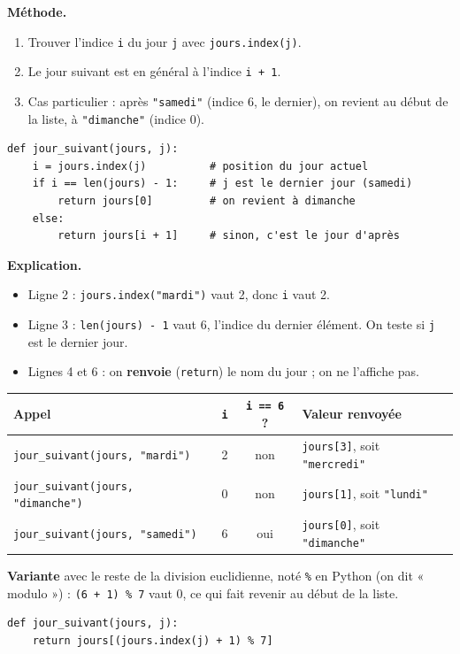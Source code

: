 \documentclass[11pt, a4paper]{exam}
\newcommand{\code}[1]{\texttt{#1}}
\newcommand{\methode}{\noindent\textbf{Méthode.}\ }
\newcommand{\explication}{\noindent\textbf{Explication.}\ }
\begin{document}
\methode
\begin{enumerate}
\item Trouver l'indice \code{i} du jour \code{j} avec \code{jours.index(j)}.
\item Le jour suivant est en général à l'indice \code{i + 1}.
\item Cas particulier : après \code{"samedi"} (indice 6, le dernier), on revient au début de la liste, à \code{"dimanche"} (indice 0).
\end{enumerate}

\begin{reponse}
\begin{lstlisting}
def jour_suivant(jours, j):
    i = jours.index(j)          # position du jour actuel
    if i == len(jours) - 1:     # j est le dernier jour (samedi)
        return jours[0]         # on revient à dimanche
    else:
        return jours[i + 1]     # sinon, c'est le jour d'après
\end{lstlisting}
\end{reponse}

\explication
\begin{itemize}
\item Ligne 2 : \code{jours.index("mardi")} vaut 2, donc \code{i} vaut 2.
\item Ligne 3 : \code{len(jours) - 1} vaut 6, l'indice du dernier élément. On teste si \code{j} est le dernier jour.
\item Lignes 4 et 6 : on \textbf{renvoie} (\code{return}) le nom du jour ; on ne l'affiche pas.
\end{itemize}

\begin{center}\small
\begin{tabular}{|l|c|c|l|}\hline
Appel & \code{i} & \code{i == 6} ? & Valeur renvoyée \\\hline
\code{jour\_suivant(jours, "mardi")} & 2 & non & \code{jours[3]}, soit \code{"mercredi"} \\\hline
\code{jour\_suivant(jours, "dimanche")} & 0 & non & \code{jours[1]}, soit \code{"lundi"} \\\hline
\code{jour\_suivant(jours, "samedi")} & 6 & oui & \code{jours[0]}, soit \code{"dimanche"} \\\hline
\end{tabular}
\end{center}

\textbf{Variante} avec le reste de la division euclidienne, noté \code{\%} en Python (on dit « modulo ») : \code{(6 + 1) \% 7} vaut 0, ce qui fait revenir au début de la liste.
\begin{lstlisting}
def jour_suivant(jours, j):
    return jours[(jours.index(j) + 1) % 7]
\end{lstlisting}
\end{document}
